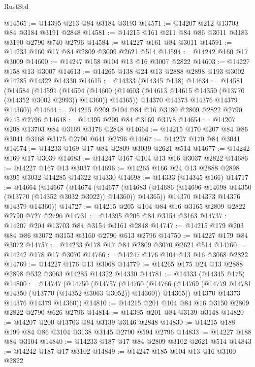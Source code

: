 \begin{lexlean}{RustStd}
\begin{coremodule}
@14565 := @14395 @213 @84 @3184 @3193
@14571 := @14207 @212 @13703 @84 @3184 @3191 @2848
@14581 := @14215 @161 @211 @84 @86 @3011 @3183 @3190 @2790 @740 @2796
@14584 := @14227 @161 @84 @3011
@14591 := @14233 @160 @17 @84 @2809 @3009 @2621 @514
@14594 := @14242 @160 @17 @3009
@14600 := @14247 @158 @104 @13 @16 @3007 @2822
@14603 := @14227 @158 @13 @3007
@14613 := @14265 @138 @24 @13 @2888 @2898 @193 @3002 @14285 @14322 @14330
@14615 := @14333 (@14345 @138)
@14634 := @14581
    (@14584
      (@14591
        (@14594
          (@14600 (@14603 (@14613 @14615 @14350 (@13770 (@14352 @3002 @2993)) @14360)) @14365))
        @14370
        @14373
        @14376
        @14379
        @14360))
@14644 := @14215 @209 @104 @84 @16 @3180 @2809 @2822 @2790 @745 @2796
@14648 := @14395 @209 @84 @3169 @3178
@14654 := @14207 @208 @13703 @84 @3169 @3176 @2848
@14664 := @14215 @170 @207 @84 @86 @3041 @3168 @3175 @2790 @641 @2796
@14667 := @14227 @170 @84 @3041
@14674 := @14233 @169 @17 @84 @2809 @3039 @2621 @514
@14677 := @14242 @169 @17 @3039
@14683 := @14247 @167 @104 @13 @16 @3037 @2822
@14686 := @14227 @167 @13 @3037
@14696 := @14265 @166 @24 @13 @2888 @2898 @395 @3032 @14285 @14322 @14330
@14698 := @14333 (@14345 @166)
@14717 := @14664
    (@14667
      (@14674
        (@14677
          (@14683 (@14686 (@14696 @14698 @14350 (@13770 (@14352 @3032 @3022)) @14360)) @14365))
        @14370
        @14373
        @14376
        @14379
        @14360))
@14727 := @14215 @205 @104 @84 @16 @3165 @2809 @2822 @2790 @727 @2796
@14731 := @14395 @205 @84 @3154 @3163
@14737 := @14207 @204 @13703 @84 @3154 @3161 @2848
@14747 := @14215 @179 @203 @84 @86 @3072 @3153 @3160 @2790 @613 @2796
@14750 := @14227 @179 @84 @3072
@14757 := @14233 @178 @17 @84 @2809 @3070 @2621 @514
@14760 := @14242 @178 @17 @3070
@14766 := @14247 @176 @104 @13 @16 @3068 @2822
@14769 := @14227 @176 @13 @3068
@14779 := @14265 @175 @24 @13 @2888 @2898 @532 @3063 @14285 @14322 @14330
@14781 := @14333 (@14345 @175)
@14800 := @14747
    (@14750
      (@14757
        (@14760
          (@14766 (@14769 (@14779 @14781 @14350 (@13770 (@14352 @3063 @3052)) @14360)) @14365))
        @14370
        @14373
        @14376
        @14379
        @14360))
@14810 := @14215 @201 @104 @84 @16 @3150 @2809 @2822 @2790 @626 @2796
@14814 := @14395 @201 @84 @3139 @3148
@14820 := @14207 @200 @13703 @84 @3139 @3146 @2848
@14830 := @14215 @188 @199 @84 @86 @3104 @3138 @3145 @2790 @594 @2796
@14833 := @14227 @188 @84 @3104
@14840 := @14233 @187 @17 @84 @2809 @3102 @2621 @514
@14843 := @14242 @187 @17 @3102
@14849 := @14247 @185 @104 @13 @16 @3100 @2822

\end{coremodule}
\end{lexlean}
